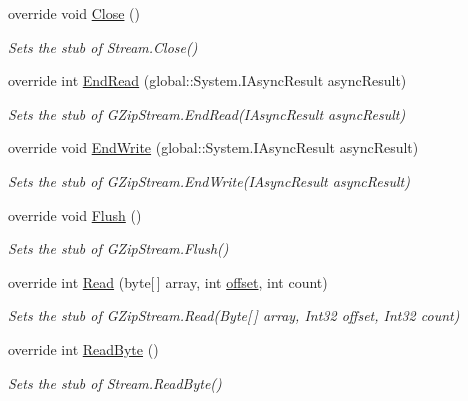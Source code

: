 \begin{DoxyCompactItemize}
override void \hyperlink{class_system_1_1_i_o_1_1_compression_1_1_fakes_1_1_stub_g_zip_stream_a0b20afc9dd26f0d858e2059a521dd18f}{Close} ()
\begin{DoxyCompactList}\small\item\em Sets the stub of Stream.\-Close()\end{DoxyCompactList}\item 
override int \hyperlink{class_system_1_1_i_o_1_1_compression_1_1_fakes_1_1_stub_g_zip_stream_ad0d7bb4fd000b0d4db3abb06ef36f499}{End\-Read} (global\-::\-System.\-I\-Async\-Result async\-Result)
\begin{DoxyCompactList}\small\item\em Sets the stub of G\-Zip\-Stream.\-End\-Read(\-I\-Async\-Result async\-Result)\end{DoxyCompactList}\item 
override void \hyperlink{class_system_1_1_i_o_1_1_compression_1_1_fakes_1_1_stub_g_zip_stream_ac58d20d62d269e5e7d82617703d0badf}{End\-Write} (global\-::\-System.\-I\-Async\-Result async\-Result)
\begin{DoxyCompactList}\small\item\em Sets the stub of G\-Zip\-Stream.\-End\-Write(\-I\-Async\-Result async\-Result)\end{DoxyCompactList}\item 
override void \hyperlink{class_system_1_1_i_o_1_1_compression_1_1_fakes_1_1_stub_g_zip_stream_a1772b82f32460e48bc9ca40c5882b616}{Flush} ()
\begin{DoxyCompactList}\small\item\em Sets the stub of G\-Zip\-Stream.\-Flush()\end{DoxyCompactList}\item 
override int \hyperlink{class_system_1_1_i_o_1_1_compression_1_1_fakes_1_1_stub_g_zip_stream_a07ba540a3a9392a0b2762063aff425a9}{Read} (byte\mbox{[}$\,$\mbox{]} array, int \hyperlink{jquery-1_810_82_8js_a4a9f594d20d927164551fc7fa4751a2f}{offset}, int count)
\begin{DoxyCompactList}\small\item\em Sets the stub of G\-Zip\-Stream.\-Read(\-Byte\mbox{[}$\,$\mbox{]} array, Int32 offset, Int32 count)\end{DoxyCompactList}\item 
override int \hyperlink{class_system_1_1_i_o_1_1_compression_1_1_fakes_1_1_stub_g_zip_stream_af321f0f1647b7835c0f91fe912f2824f}{Read\-Byte} ()
\begin{DoxyCompactList}\small\item\em Sets the stub of Stream.\-Read\-Byte()\end{DoxyCompactList}\item 

\end{DoxyCompactItemize}
